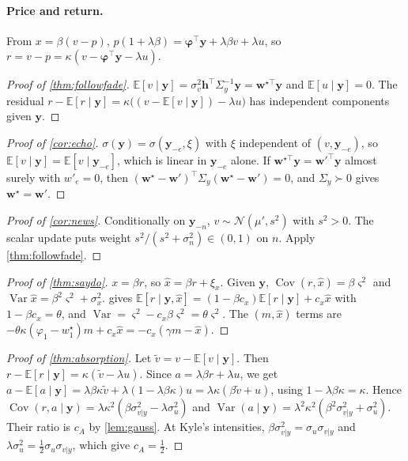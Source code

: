 \documentclass{article}
\theoremstyle{plain}
\theoremstyle{definition}
\theoremstyle{remark}
\newcommand{\E}{\mathbb{E}}
\newcommand{\N}{\mathcal{N}}
\newcommand{\w}{\bm{w}}
\newcommand{\y}{\bm{y}}
\newcommand{\h}{\bm{h}}
\newcommand{\bphi}{\bm{\varphi}}
\DeclareMathOperator{\Var}{Var}
\DeclareMathOperator{\Cov}{Cov}
\begin{document}
\paragraph{Price and return.} From $x=\beta(v-p)$, $p(1+\lambda\beta)=\bphi^\top\y+\lambda\beta v+\lambda u$, so $r=v-p=\kappa(v-\bphi^\top\y-\lambda u)$.

\begin{proof}[Proof of \cref{thm:followfade}]
$\E[v\mid\y]=\sigma_v^2\h^\top\Sigma_y^{-1}\y=\w^{\star\top}\y$ and $\E[u\mid\y]=0$. The residual $r-\E[r\mid\y]=\kappa\big((v-\E[v\mid\y])-\lambda u\big)$ has independent components given $\y$.
\end{proof}

\begin{proof}[Proof of \cref{cor:echo}]
$\sigma(\y)=\sigma(\y_{-e},\xi)$ with $\xi$ independent of $(v,\y_{-e})$, so $\E[v\mid\y]=\E[v\mid\y_{-e}]$, which is linear in $\y_{-e}$ alone. If $\w^{\star\top}\y=\w'^\top\y$ almost surely with $w'_e=0$, then $(\w^\star-\w')^\top\Sigma_y(\w^\star-\w')=0$, and $\Sigma_y\succ0$ gives $\w^\star=\w'$.
\end{proof}

\begin{proof}[Proof of \cref{cor:news}]
Conditionally on $\y_{-n}$, $v\sim\N(\mu',s^2)$ with $s^2>0$. The scalar update puts weight $s^2/(s^2+\sigma_n^2)\in(0,1)$ on $n$. Apply \cref{thm:followfade}.
\end{proof}

\begin{proof}[Proof of \cref{thm:saydo}]
$x=\beta r$, so $\hat x=\beta r+\xi_x$. Given $\y$, $\Cov(r,\hat x)=\beta\varsigma^2$ and $\Var\hat x=\beta^2\varsigma^2+\sigma_x^2$.  gives $\E[r\mid\y,\hat x]=(1-\beta c_x)\E[r\mid\y]+c_x\hat x$ with $1-\beta c_x=\theta$, and $\Var=\varsigma^2-c_x\beta\varsigma^2=\theta\varsigma^2$. The $(m,\hat x)$ terms are $-\theta\kappa(\varphi_1-w^\star_1)m+c_x\hat x=-c_x(\gamma m-\hat x)$.
\end{proof}

\begin{proof}[Proof of \cref{thm:absorption}]
Let $\tilde v=v-\E[v\mid\y]$. Then $r-\E[r\mid\y]=\kappa(\tilde v-\lambda u)$. Since $a=\lambda\beta r+\lambda u$, we get $a-\E[a\mid\y]=\lambda\beta\kappa\tilde v+\lambda(1-\lambda\beta\kappa)u=\lambda\kappa(\beta\tilde v+u)$, using $1-\lambda\beta\kappa=\kappa$. Hence $\Cov(r,a\mid\y)=\lambda\kappa^2(\beta\sigma^2_{v|y}-\lambda\sigma_u^2)$ and $\Var(a\mid\y)=\lambda^2\kappa^2(\beta^2\sigma^2_{v|y}+\sigma_u^2)$. Their ratio is $c_A$ by \cref{lem:gauss}. At Kyle's intensities, $\beta\sigma^2_{v|y}=\sigma_u\sigma_{v|y}$ and $\lambda\sigma_u^2=\tfrac12\sigma_u\sigma_{v|y}$, which give $c_A=\tfrac12$.
\end{proof}
\end{document}
